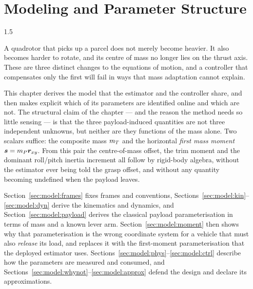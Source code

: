 
\chapter{Modeling and Parameter Structure}
\label{ch:model}
\begin{spacing}{1.5}
\setlength{\parskip}{0.22in}

A quadrotor that picks up a parcel does not merely become heavier. It also
becomes harder to rotate, and its centre of mass no longer lies on the thrust
axis. These are three distinct changes to the equations of motion, and a
controller that compensates only the first will fail in ways that mass
adaptation cannot explain.

This chapter derives the model that the estimator and the controller share, and
then makes explicit which of its parameters are identified online and which are
not. The structural claim of the chapter --- and the reason the method needs so
little sensing --- is that the three payload-induced quantities are not three
independent unknowns, but neither are they functions of the mass alone. Two
scalars suffice: the composite mass $m_T$ and the horizontal \emph{first mass
moment} $\bm{s}=m_P\bm{r}_{xy}$. From this pair the centre-of-mass offset, the
trim moment and the dominant roll/pitch inertia increment all follow by
rigid-body algebra, without the estimator ever being told the grasp offset, and
without any quantity becoming undefined when the payload leaves.

Section~\ref{sec:model:frames} fixes frames and conventions,
Sections~\ref{sec:model:kin}--\ref{sec:model:dyn} derive the kinematics and
dynamics, and Section~\ref{sec:model:payload} derives the classical payload
parameterisation in terms of mass and a known lever arm.
Section~\ref{sec:model:moment} then shows why that parameterisation is the wrong
coordinate system for a vehicle that must also \emph{release} its load, and
replaces it with the first-moment parameterisation that the deployed estimator
uses. Sections~\ref{sec:model:phys}--\ref{sec:model:ctrl} describe how the
parameters are measured and consumed, and
Sections~\ref{sec:model:whynot}--\ref{sec:model:approx} defend the design and
declare its approximations.


\end{spacing}

